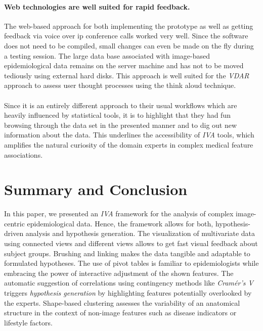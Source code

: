 \documentclass[journal]{style/vgtc} 			          %
\begin{document}
\paragraph{Web technologies are well suited for rapid feedback.}
The web-based approach for both implementing the prototype as well as getting feedback via voice over ip conference calls worked very well.
%
Since the software does not need to be compiled, small changes can even be made on the fly during a testing session.
%
The large data base associated with image-based epidemiological data remains on the server machine and has not to be moved tediously using external hard disks.
%
This approach is well suited for the \emph{VDAR} approach to assess user thought processes using the think aloud technique.
\\\\
Since it is an entirely different approach to their usual workflows which are heavily influenced by statistical tools, it is to highlight that they had fun browsing through the data set in the presented manner and to dig out new information about the data.
%
This underlines the accessibility of \emph{IVA} tools, which amplifies the natural curiosity of the domain experts in complex medical feature associations.

\section{Summary and Conclusion}
In this paper, we presented an \emph{IVA} framework for the analysis of complex image-centric epidemiological data.
%
Hence, the framework allows for both, hypothesis-driven analysis and hypothesis generation.
%
The visualization of multivariate data using connected views and different views allows to get fast visual feedback about subject groups.
%
Brushing and linking makes the data tangible and adaptable to formulated hypotheses.
%
The use of pivot tables is familiar to epidemiologists while embracing the power of interactive adjustment of the shown features.
%
The automatic suggestion of correlations using contingency methods like \emph{Cram\'{e}r's V} triggers \emph{hypothesis generation} by highlighting features potentially overlooked by the experts.
%
Shape-based clustering assesses the variability of an anatomical structure in the context of non-image features such as disease indicators or lifestyle factors.
\end{document}
